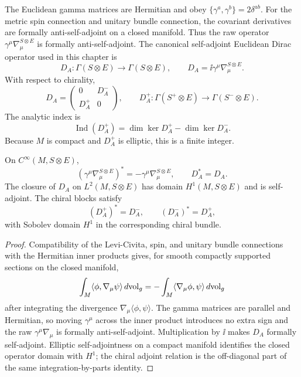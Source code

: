 The Euclidean gamma matrices are Hermitian and obey
\(\{\gamma^a,\gamma^b\}=2\delta^{ab}\).  For the metric spin connection and
unitary bundle connection, the covariant derivatives are formally
anti-self-adjoint on a closed manifold.  Thus the raw operator
\(\gamma^\mu\nabla_\mu^{S\otimes E}\) is formally anti-self-adjoint.  The
canonical self-adjoint Euclidean Dirac operator used in this chapter is
\[
  D_A:\Gamma(S\otimes E)\longrightarrow\Gamma(S\otimes E),
  \qquad
  D_A=\ii\gamma^\mu\nabla_\mu^{S\otimes E}.
\]
With respect to chirality,
\[
  D_A=
  \begin{pmatrix}
  0 & D_A^-\\
  D_A^+ & 0
  \end{pmatrix},
  \qquad
  D_A^+:\Gamma(S^+\otimes E)\to\Gamma(S^-\otimes E).
\]
The analytic index is
\begin{equation}
  \operatorname{Ind}(D_A^+)
  =
  \dim\ker D_A^+-\dim\ker D_A^- .
  \label{eq:index-analytic-definition}
\end{equation}
Because \(M\) is compact and \(D_A^+\) is elliptic, this is a finite integer.

\begin{lemma}
\label{lem:index-dirac-formal-adjointness}
On \(C^\infty(M,S\otimes E)\),
\[
  \left(\gamma^\mu\nabla_\mu^{S\otimes E}\right)^\ast
  =
  -\gamma^\mu\nabla_\mu^{S\otimes E},
  \qquad
  D_A^\ast=D_A .
\]
The closure of \(D_A\) on \(L^2(M,S\otimes E)\) has domain
\(H^1(M,S\otimes E)\) and is self-adjoint.  The chiral blocks satisfy
\[
  (D_A^+)^\ast=D_A^- ,
  \qquad
  (D_A^-)^\ast=D_A^+ ,
\]
with Sobolev domain \(H^1\) in the corresponding chiral bundle.
\end{lemma}

\begin{proof}
Compatibility of the Levi-Civita, spin, and unitary bundle connections with
the Hermitian inner products gives, for smooth compactly supported sections
on the closed manifold,
\[
  \int_M\langle \phi,\nabla_\mu\psi\rangle\,d{\rm vol}_g
  =
  -\int_M\langle \nabla_\mu\phi,\psi\rangle\,d{\rm vol}_g
\]
after integrating the divergence
\(\nabla_\mu\langle\phi,\psi\rangle\).  The gamma matrices are parallel and
Hermitian, so moving \(\gamma^\mu\) across the inner product introduces no
extra sign and the raw \(\gamma^\mu\nabla_\mu\) is formally
anti-self-adjoint.  Multiplication by \(\ii\) makes \(D_A\) formally
self-adjoint.  Elliptic self-adjointness on a compact manifold identifies the
closed operator domain with \(H^1\); the chiral adjoint relation is the
off-diagonal part of the same integration-by-parts identity.
\end{proof}

